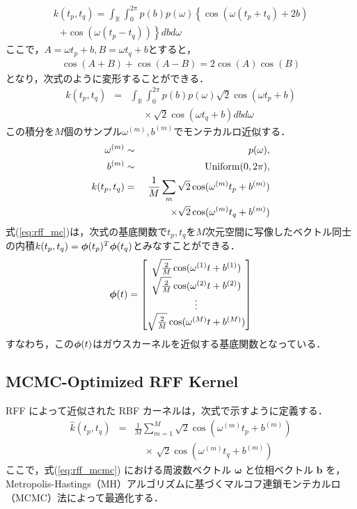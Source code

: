 \documentclass[conference]{IEEEtran}
\begin{document}
%
\begin{eqnarray}
k(t_p,t_q) = \int_\mathbb{R} \int_0^{2 \pi} p(b) p(\omega) \left\{ \cos(\omega (t_p + t_q) + 2 b) \right. \nonumber \\
~~~ \left. +\cos(\omega (t_p - t_q)) \right\} db d \omega 
\end{eqnarray}
%
ここで，$A=\omega t_p +b, B = \omega t_q +b $とすると，
%
\begin{eqnarray}
\cos(A+B) + \cos(A-B)= 2 \cos(A)\cos(B)
\end{eqnarray}
%
となり，次式のように変形することができる．
%
\begin{eqnarray}
k(t_p,t_q) &=& \int_\mathbb{R} \int_0^{2 \pi} p(b) p(\omega) \sqrt{2} \cos(\omega t_p +b) \nonumber \\
&&~~~~~~ \times \sqrt{2} \cos(\omega t_q +b) db d \omega 
\end{eqnarray}
%
この積分を$M$個のサンプル$\omega^{(m)}, b^{(m)}$でモンテカルロ近似する．
%
\begin{eqnarray}
\omega^{(m)} &\sim& p(\omega), \\
b^{(m)} &\sim& {\rm Uniform}(0, 2 \pi), \\
{k}(t_p,t_q) &=& \frac{1}{M} \sum_m  \sqrt{2}\cos(\omega^{(m)} t_p +b^{(m)}) \nonumber \\
&&~~~~~~~~ \times \sqrt{2}\cos(\omega^{(m)} t_q +b^{(m)})  \label{eq:rff_mc}
\end{eqnarray}
%
式(\ref{eq:rff_mc})は，次式の基底関数で$t_p, t_q$を$M$次元空間に写像したベクトル同士の内積${k}(t_p,t_q)={\boldsymbol\phi}(t_p)^T {\boldsymbol\phi}(t_q)$とみなすことができる．
%
\begin{eqnarray}
{\boldsymbol\phi}(t) =  
\begin{bmatrix}
\sqrt{\frac{2}{M}} \cos(\omega^{(1)} t +b^{(1)}) \\
\sqrt{\frac{2}{M}} \cos(\omega^{(2)} t +b^{(2)}) \\
\vdots \\
\sqrt{\frac{2}{M}} \cos(\omega^{(M)} t +b^{(M)}) \\
\end{bmatrix}
\end{eqnarray}
%
すなわち，この${\boldsymbol\phi}(t)$はガウスカーネルを近似する基底関数となっている．

\subsection{MCMC-Optimized RFF Kernel}
RFF によって近似された RBF カーネルは，次式で示すように定義する．
\begin{eqnarray}
  \hat{k}(t_p,t_q)
    &=& \frac{1}{M}\sum_{m=1}^M \sqrt{2}\cos(\omega^{(m)}t_p + b^{(m)}) \nonumber\\
    &&\quad \times\,\sqrt{2}\cos(\omega^{(m)}t_q + b^{(m)})
  \label{eq:rff_mcmc}
\end{eqnarray}
ここで，式(\ref{eq:rff_mcmc}) における周波数ベクトル $\boldsymbol{\omega}$ と位相ベクトル $\boldsymbol{b}$ を，Metropolis-Hastings（MH）アルゴリズムに基づくマルコフ連鎖モンテカルロ（MCMC）法\cite{Hastings1970}によって最適化する．
\end{document}
